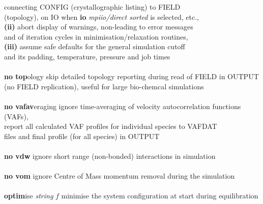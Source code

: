 \begin{tabbing}
\>                                              \> connecting CONFIG (crystallographic listing) to FIELD \\
\>                                              \> (topology), on IO when {\bf io} {\em mpiio/direct sorted} is selected, etc., \\
\>                                              \> {\bf (ii)} abort display of warnings, non-leading to error messages \\
\>                                              \> and of iteration cycles in minimisation/relaxation routines, \\
\>                                              \> {\bf (iii)} assume safe defaults for the general simulation cutoff \\
\>                                              \> and its padding, temperature, pressure and job times \\
\>                                              \> \\
\> {\bf no top}ology                            \> skip detailed topology reporting during read of FIELD in OUTPUT \\
\>                                              \> (no FIELD replication), useful for large bio-chemcal simulations \\
\>                                              \> \\
\> {\bf no vafav}eraging                        \> ignore time-averaging of velocity autocorrelation functions (VAFs), \\
\>                                              \> report all calculated VAF profiles for individual species to VAFDAT \\
\>                                              \> files and final profile (for all species) in OUTPUT \\
\>                                              \> \\
\> {\bf no vdw}                                 \> ignore short range (non-bonded) interactions in simulation \\
\>                                              \> \\
\> {\bf no vom}                                 \> ignore Centre of Mass momentum removal during the simulation \\
\>                                              \> \\
\> {\bf optim}ise {\em string} $f$              \> minimise the system configuration at start during equilibration \\

\end{tabbing}
